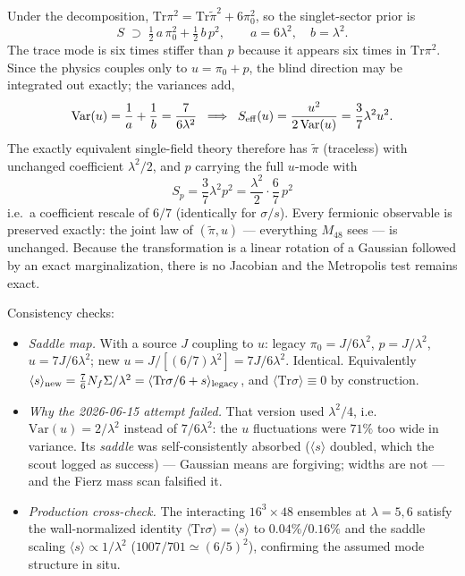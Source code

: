 \documentclass[11pt]{article}
\newcommand{\Tr}{\mathrm{Tr}}
\newcommand{\Sig}{\Sigma}
\begin{document}
Under the decomposition, $\Tr\pi^{2}=\Tr\tilde\pi^{2}+6\pi_{0}^{2}$, so the
singlet-sector prior is
\begin{equation}
S \;\supset\; \tfrac12\,a\,\pi_{0}^{2}+\tfrac12\,b\,p^{2},
\qquad a=6\lambda^{2},\quad b=\lambda^{2}.
\end{equation}
The trace mode is six times stiffer than $p$ because it appears six times in
$\Tr\pi^{2}$.  Since the physics couples only to $u=\pi_{0}+p$, the blind
direction may be integrated out exactly; the variances add,
\begin{equation}
\mathrm{Var}(u)=\frac1a+\frac1b=\frac{7}{6\lambda^{2}}
\;\;\Longrightarrow\;\;
S_{\rm eff}(u)=\frac{u^{2}}{2\,\mathrm{Var}(u)}=\frac{3}{7}\lambda^{2}u^{2}.
\label{eq:seff}
\end{equation}
The exactly equivalent single-field theory therefore has $\tilde\pi$
(traceless) with unchanged coefficient $\lambda^{2}/2$, and $p$ carrying the
full $u$-mode with
\begin{equation}
\boxed{\;S_{p}=\frac{3}{7}\lambda^{2}p^{2}
 =\frac{\lambda^{2}}{2}\cdot\frac{6}{7}\,p^{2}\;}
\end{equation}
i.e.\ a coefficient rescale of $6/7$ (identically for $\sigma/s$).  Every
fermionic observable is preserved exactly: the joint law of
$(\tilde\pi,u)$ --- everything $M_{48}$ sees --- is unchanged.  Because the
transformation is a linear rotation of a Gaussian followed by an exact
marginalization, there is no Jacobian and the Metropolis test remains exact.

Consistency checks:
\begin{itemize}
\item \emph{Saddle map.}  With a source $J$ coupling to $u$: legacy
$\pi_{0}=J/6\lambda^{2}$, $p=J/\lambda^{2}$, $u=7J/6\lambda^{2}$; new
$u=J/[(6/7)\lambda^{2}]=7J/6\lambda^{2}$.  Identical.  Equivalently
$\langle s\rangle_{\rm new}=\tfrac{7}{6}N_{f}\Sig/\lambda^{2}
=\langle \Tr\sigma/6+s\rangle_{\rm legacy}$, and
$\langle\Tr\sigma\rangle\equiv 0$ by construction.
\item \emph{Why the 2026-06-15 attempt failed.}  That version used
$\lambda^{2}/4$, i.e.\ $\mathrm{Var}(u)=2/\lambda^{2}$ instead of
$7/6\lambda^{2}$: the $u$ fluctuations were $71\%$ too wide in variance.
Its \emph{saddle} was self-consistently absorbed ($\langle s\rangle$
doubled, which the scout logged as success) --- Gaussian means are
forgiving; widths are not --- and the Fierz mass scan falsified it.
\item \emph{Production cross-check.}  The interacting $16^{3}\times48$
ensembles at $\lambda=5,6$ satisfy the wall-normalized identity
$\langle\Tr\sigma\rangle=\langle s\rangle$ to $0.04\%/0.16\%$ and the
saddle scaling $\langle s\rangle\propto 1/\lambda^{2}$
($1007/701\simeq(6/5)^{2}$), confirming the assumed mode structure in situ.
\end{itemize}
\end{document}
